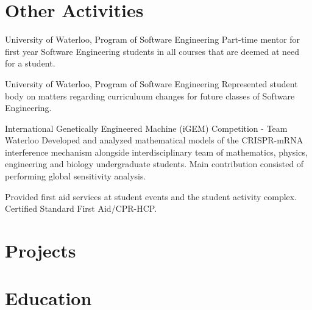 \documentclass[oneside, 10pt]{memoir}
\begin{document}
\section*{Other Activities}
\begin{adjustwidth}{1em}{0em}%
    {University of Waterloo, Program of Software Engineering}{
        Part-time mentor for first year Software Engineering students in all courses that are deemed at need for a student.
    }

    {University of Waterloo, Program of Software Engineering}{
        Represented student body on matters regarding curriculuum changes for future classes of Software Engineering.
    }

    {International Genetically Engineered Machine (iGEM) Competition - Team Waterloo} {
        Developed and analyzed mathematical models of the CRISPR-mRNA interference mechanism alongside
        interdisciplinary team of mathematics, physics, engineering and biology undergraduate students.
        Main contribution consisted of performing global sensitivity analysis.
    }

     {
        Provided first aid services at student events and the student activity complex. 
        Certified Standard First Aid/CPR-HCP.
    }
\end{adjustwidth}


\section*{Projects}
\begin{adjustwidth}{1em}{0em}%

\end{adjustwidth}

\section*{Education}
\begin{adjustwidth}{1em}{0em}%

\end{adjustwidth}
\end{document}
